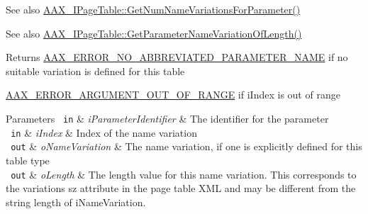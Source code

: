 \begin{DoxyItemize}
\item \begin{DoxySeeAlso}{See also}
\mbox{\hyperlink{a01849_af8be797a3ec7ed3117e720dd29ea7cc7}{A\+A\+X\+\_\+\+I\+Page\+Table\+::\+Get\+Num\+Name\+Variations\+For\+Parameter()}}
\end{DoxySeeAlso}

\item \begin{DoxySeeAlso}{See also}
\mbox{\hyperlink{a01849_a6ddd61f6ba18b8be8141363d5234ed9d}{A\+A\+X\+\_\+\+I\+Page\+Table\+::\+Get\+Parameter\+Name\+Variation\+Of\+Length()}}
\end{DoxySeeAlso}
\begin{DoxyReturn}{Returns}
\mbox{\hyperlink{a00494_a5f8c7439f3a706c4f8315a9609811937ab7383b0169f6dfa5f86b1fefd6c58ae2}{A\+A\+X\+\_\+\+E\+R\+R\+O\+R\+\_\+\+N\+O\+\_\+\+A\+B\+B\+R\+E\+V\+I\+A\+T\+E\+D\+\_\+\+P\+A\+R\+A\+M\+E\+T\+E\+R\+\_\+\+N\+A\+ME}} if no suitable variation is defined for this table

\mbox{\hyperlink{a00494_a5f8c7439f3a706c4f8315a9609811937a8dd2fdd469583a046765eae9178678a3}{A\+A\+X\+\_\+\+E\+R\+R\+O\+R\+\_\+\+A\+R\+G\+U\+M\+E\+N\+T\+\_\+\+O\+U\+T\+\_\+\+O\+F\+\_\+\+R\+A\+N\+GE}} if {\ttfamily i\+Index} is out of range
\end{DoxyReturn}

\begin{DoxyParams}[1]{Parameters}
\mbox{\texttt{ in}}  & {\em i\+Parameter\+Identifier} & The identifier for the parameter \\
\hline
\mbox{\texttt{ in}}  & {\em i\+Index} & Index of the name variation \\
\hline
\mbox{\texttt{ out}}  & {\em o\+Name\+Variation} & The name variation, if one is explicitly defined for this table type \\
\hline
\mbox{\texttt{ out}}  & {\em o\+Length} & The length value for this name variation. This corresponds to the variation\textquotesingle{}s {\ttfamily sz} attribute in the page table X\+ML and may be different from the string length of {\ttfamily i\+Name\+Variation}. \\
\hline
\end{DoxyParams}

\end{DoxyItemize}\mbox{\label{a01729_ac4de2771c4025a98f83b89fc6104d9b0}} 
